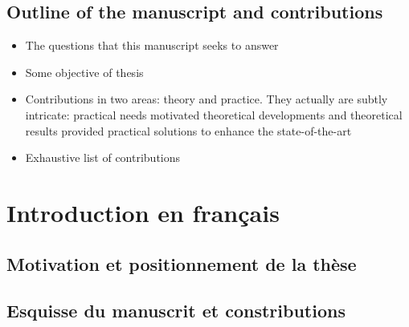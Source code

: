 \section{Outline of the manuscript and contributions}

\begin{itemize}
    \item The questions that this manuscript seeks to answer
    \item Some objective of thesis
    \item Contributions in two areas: theory and practice. They actually are subtly intricate: practical needs motivated theoretical developments and theoretical results provided practical solutions to enhance the state-of-the-art
    \item Exhaustive list of contributions
\end{itemize}






\chapter{Introduction en français}

\section{Motivation et positionnement de la thèse}

\section{Esquisse du manuscrit et constributions}